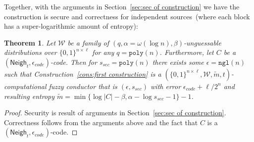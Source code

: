 \documentclass[11pt]{article}
\newcommand{\secref}[1]{\mbox{Section~\ref{#1}}}
\newcommand{\lemref}[1]{\mbox{Lemma~\ref{#1}}}
\newcommand{\consref}[1]{\mbox{Construction~\ref{#1}}}
\DeclareMathOperator*{\expe}{\mathbb{E}}
\newcommand{\class}[1]{{\ensuremath{\mathsf{#1}}}}
\newcommand{\zo}{\ensuremath{\{0, 1\}}}
\newcommand{\neigh}{\ensuremath{\class{Neigh}}\xspace}
\newcommand{\dis}{\ensuremath{\mathsf{dis}}}
\newcommand{\poly}{\ensuremath{\mathtt{poly}}\xspace}
\newcommand{\ngl}{\ensuremath{\mathtt{ngl}}\xspace}
\newtheorem{theorem}{Theorem}[section]
\newtheorem{lemma}[theorem]{Lemma}
\newcommand{\authnote}[2]{{\textcolor{red}{\textsf{#1 notes: }\textcolor{blue}{ #2}}\marginpar{\textcolor{red}{\textbf{!!!!!}}}}}
\newcommand{\authnote}[2]{}
\newcommand{\bnote}[1]{{\authnote{Ben}{#1}}}
\begin{document}

Together, with the arguments in \secref{sec:sec of construction} we have the construction is secure and correctness for independent sources~(where each block has a super-logarithmic amount of entropy):
\begin{theorem}
Let $\mathcal{W}$ be a family of $(q,\alpha= \omega(\log n),  \beta)$-unguessable distributions over $\zo^{n\times \ell}$ for any $q = \poly(n)$.  Furthermore, let $C$ be a $(\neigh_t, \epsilon_{code})$-code.  Then for $s_{sec} = \poly(n)$ there exists some $\epsilon=\ngl(n)$ such that \consref{cons:first construction} is a $(\zo^{n\times \ell}, \mathcal{W}, \tilde{m}, t)$-computational fuzzy conductor that is $(\epsilon, s_{sec})$ with error $\epsilon_{code} + \ell/2^n$ and resulting entropy $\tilde{m} = \min\{\log |C| - \beta, \alpha-\log s_{sec} -1\}-1$.
\end{theorem}
\begin{proof}
Security is result of arguments in \secref{sec:sec of construction}.  Correctness follows from the arguments above and the fact that $C$ is a $(\neigh_t, \epsilon_{code})$-code.
\end{proof}
\end{document}
